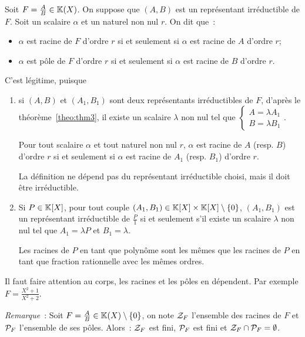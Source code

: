 \begin{defdef}
  Soit \(F=\frac{A}{B} \in \K(X)\). On suppose que \((A,B)\) est un représentant 
  irréductible de \(F\). Soit un scalaire \(\alpha\) et un naturel non nul 
  \(r\). On dit que~:
  \begin{itemize}
    \item \(\alpha\) est racine de \(F\) d'ordre \(r\) si et seulement si 
      \(\alpha\) est racine de \(A\) d'ordre \(r\);
    \item \(\alpha\) est pôle de \(F\) d'ordre \(r\) si et seulement si 
      \(\alpha\) est racine de \(B\) d'ordre \(r\).
  \end{itemize}
\end{defdef}

C'est légitime, puisque
\begin{enumerate}
  \item si \((A,B)\) et \((A_1,B_1)\) sont deux représentants irréductibles de 
    \(F\), d'après le théorème~\ref{theo:thm3}, il existe un scalaire \(\lambda\) non nul tel que 
    \(\begin{cases} A=\lambda A_1 \\ B = \lambda B_1 \end{cases}\).

      Pour tout scalaire \(\alpha\) et tout naturel non nul \(r\), \(\alpha\) 
      est racine de \(A\) (resp. \(B\)) d'ordre \(r\) si et seulement si 
      \(\alpha\) est racine de \(A_1\) (resp. \(B_1\)) d'ordre \(r\).

      La définition ne dépend pas du représentant irréductible choisi, mais il 
      doit être irréductible.
    \item Si \(P \in \K[X]\), pour tout couple \((A_1,B_1) \in \K[X] \times 
      \K[X]\setminus\{0\}\), \((A_1,B_1)\) est un représentant irréductible de 
      \(\frac{P}{1}\) si et seulement s'il existe un scalaire \(\lambda\) non 
      nul tel que \(A_1=\lambda P\) et \(B_1=\lambda\).

      Les racines de \(P\) en tant que polynôme sont les mêmes que les racines 
      de \(P\) en tant que fraction rationnelle avec les mêmes ordres.
\end{enumerate}

Il faut faire attention au corps, les racines et les pôles en dépendent. Par 
exemple \(F=\frac{X^2+1}{X^2+2}\).

\emph{Remarque}~: Soit \(F=\frac{A}{B} \in \K(X)\setminus\{0\}\), on note 
\(\ZZ_F\) l'ensemble des racines de \(F\) et \(\P_F\) l'ensemble de ses pôles. 
Alors~: \(\ZZ_F\) est fini, \(\P_F\) est fini et \(\ZZ_F \cap \P_F =\emptyset\).

